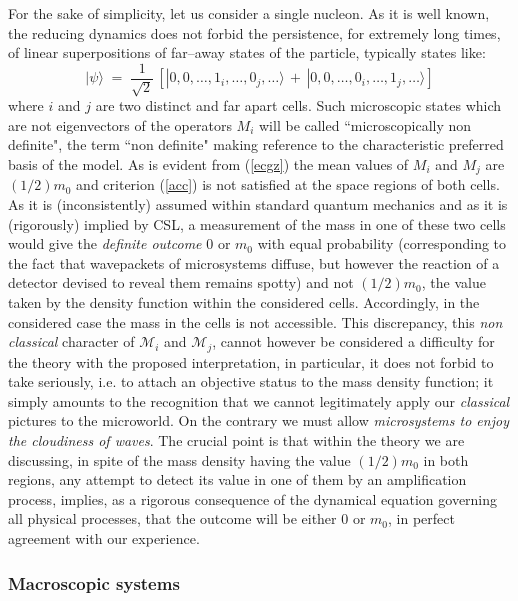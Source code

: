\documentclass[10pt,a4paper]{article}
\begin{document}
For the sake of simplicity, let us consider a single nucleon. As
it is well known, the reducing dynamics does not forbid the
persistence, for extremely long times, of linear superpositions of
far--away states of the particle, typically states like:
\begin{equation} \label{ecgz}
|\psi\rangle \; = \; \frac{1}{\sqrt{2}}\,\left[
|0,0,\ldots,1_{i},\ldots,0_{j},\ldots\rangle \, + \,
|0,0,\ldots,0_{i},\ldots,1_{j},\ldots\rangle \right]
\end{equation}
where $i$ and $j$ are two distinct and far apart cells. Such
microscopic states which are not eigenvectors of the operators
$M_{i}$ will be called ``microscopically non definite", the term
``non definite" making reference to the characteristic preferred
basis of the model. As is evident from (\ref{ecgz}) the mean
values of $M_{i}$ and $M_{j}$ are $(1/2)m_{0}$ and criterion
(\ref{acc}) is not satisfied at the space regions of both cells.
As it is (inconsistently) assumed within standard quantum
mechanics and as it is (rigorously) implied by CSL, a measurement
of the mass in one of these two cells would give the {\it definite
outcome} $0$ or $m_{0}$ with equal probability (corresponding to
the fact that wavepackets of microsystems diffuse, but however the
reaction of a detector devised to reveal them remains spotty) and
not $(1/2)m_{0}$, the value taken by the density function within
the considered cells. Accordingly, in the considered case the mass
in the cells is not accessible. This discrepancy, this {\it non
classical} character of ${\mathcal M}_{i}$ and ${\mathcal M}_{j}$,
cannot however be considered a difficulty for the theory with the
proposed interpretation, in particular, it does not forbid to take
seriously, i.e. to attach an objective status to the mass density
function; it simply amounts to the recognition  that we cannot
legitimately apply our {\it classical} pictures to the microworld.
On the contrary we must allow \cite{bellns} {\it microsystems to
enjoy the cloudiness of waves}. The crucial point is that within
the theory we are discussing, in spite of the mass density having
the value $(1/2)m_{0}$ in both regions, any attempt to detect its
value in one of them by an amplification process, implies, as a
rigorous consequence of the dynamical equation governing all
physical processes, that the outcome will be either $0$ or
$m_{0}$, in perfect agreement with our experience.

\subsubsection{Macroscopic systems} \label{sec1232}
\end{document}
